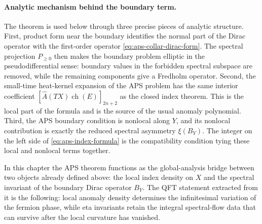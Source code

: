 \paragraph{Analytic mechanism behind the boundary term.}
The theorem is used below through three precise pieces of analytic structure.
First, product form near the boundary identifies the normal part of the Dirac
operator with the first-order operator
\eqref{eq:aps-collar-dirac-form}.  The spectral projection
\(P_{\geq0}\) then makes the boundary problem elliptic in the
pseudodifferential sense: boundary values in the forbidden spectral subspace
are removed, while the remaining components give a Fredholm operator.  Second,
the small-time heat-kernel expansion of the APS problem has the same interior
coefficient \([\widehat A(TX)\operatorname{ch}(E)]_{2n+2}\) as the closed
index theorem.  This is the local part of the formula and is the source of the
usual anomaly polynomial.  Third, the APS boundary condition is nonlocal along
\(Y\), and its nonlocal contribution is exactly the reduced spectral
asymmetry \(\xi(B_Y)\).  The integer on the left side of
\eqref{eq:aps-index-formula} is the compatibility condition tying these local
and nonlocal terms together.

In this chapter the APS theorem functions as the global-analysis bridge
between two objects already defined above: the local index density on \(X\) and
the spectral invariant of the boundary Dirac operator \(B_Y\).  The QFT
statement extracted from it is the following: local anomaly density determines
the infinitesimal variation of the fermion phase, while eta invariants retain
the integral spectral-flow data that can survive after the local curvature has
vanished.

